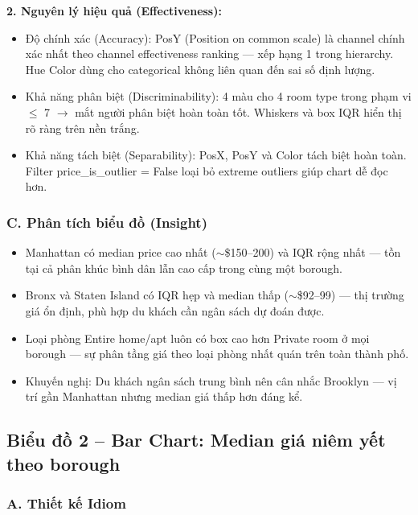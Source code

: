 \textbf{2. Nguyên lý hiệu quả (Effectiveness):}

\begin{itemize}
    \item Độ chính xác (Accuracy): PosY (Position on common scale) là channel chính xác nhất theo channel effectiveness ranking --- xếp hạng 1 trong hierarchy. Hue Color dùng cho categorical không liên quan đến sai số định lượng.
    \item Khả năng phân biệt (Discriminability): 4 màu cho 4 room type trong phạm vi $\leq$ 7 $\rightarrow$ mắt người phân biệt hoàn toàn tốt. Whiskers và box IQR hiển thị rõ ràng trên nền trắng.
    \item Khả năng tách biệt (Separability): PosX, PosY và Color tách biệt hoàn toàn. Filter price\_is\_outlier = False loại bỏ extreme outliers giúp chart dễ đọc hơn.
\end{itemize}

\subsubsection*{C. Phân tích biểu đồ (Insight)}

\begin{itemize}
    \item Manhattan có median price cao nhất ($\sim$\$150--200) và IQR rộng nhất --- tồn tại cả phân khúc bình dân lẫn cao cấp trong cùng một borough.
    \item Bronx và Staten Island có IQR hẹp và median thấp ($\sim$\$92--99) --- thị trường giá ổn định, phù hợp du khách cần ngân sách dự đoán được.
    \item Loại phòng Entire home/apt luôn có box cao hơn Private room ở mọi borough --- sự phân tầng giá theo loại phòng nhất quán trên toàn thành phố.
    \item Khuyến nghị: Du khách ngân sách trung bình nên cân nhắc Brooklyn --- vị trí gần Manhattan nhưng median giá thấp hơn đáng kể.
\end{itemize}

\subsection{Biểu đồ 2 -- Bar Chart: Median giá niêm yết theo borough}

\subsubsection*{A. Thiết kế Idiom}

